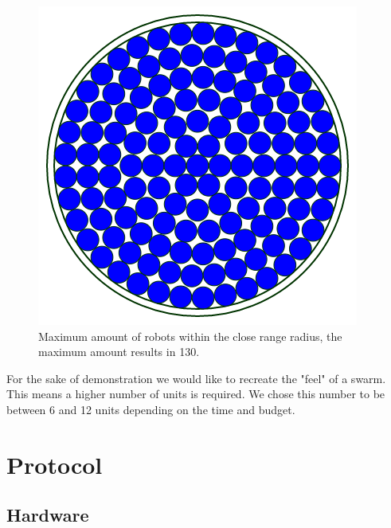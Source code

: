 \documentclass[10pt,a4paper]{article}
\begin{document}
\begin{figure}[H]
        \centering
        \graphicspath{ {./images/} }
        \includegraphics[scale=.6]{ccircle.png}
        \caption{Maximum amount of robots within the close range radius, the maximum amount results in 130.}
        \label{fig:ccircle}
\end{figure}



 For the sake of demonstration we would like to recreate the "feel" of a swarm. This means a higher number of units is required. We chose this number to be between 6 and 12 units depending on the time and budget. 

\begin{table}[h]
\centering
{}
\caption{Specifications number of units}
\label{specunits}
\end{table}


\section{Protocol}
\subsection{Hardware}
\end{document}
